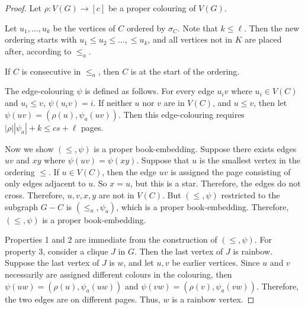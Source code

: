 \begin{proof}
	Let \(\rho: V(G) \rightarrow [c]\) be a proper colouring of \(V(G)\).

	Let \(u_1, \ldots, u_k\) be the vertices of \(C\) ordered by \(\sigma_C\). Note that \(k \leq \ell\). Then the new ordering starts with \(u_1 \leq u_2 \leq \ldots, \leq u_k\), and all vertices not in \(K\) are placed after, according to \(\leq_a\).

	If $C$ is consecutive in $\leq_a$, then $C$ is at the start of the ordering. 

	The edge-colouring \(\psi\) is defined as follows. For every edge \(u_i v\) where \(u_i \in V(C)\) and \(u_i \leq v\), \(\psi(u_i v) = i\). If neither \(u\) nor \(v\) are in \(V(C)\), and \(u \leq v\), then let \(\psi(uv) = (\rho(u), \psi_a(uv))\). Then this edge-colouring requires \(|\rho| |\psi_a| + k \leq cs + \ell\) pages.

	Now we show \((\leq, \psi)\) is a proper book-embedding. Suppose there exists edges \(uv\) and \(xy\) where \(\psi(uv) = \psi(xy)\). Suppose that \(u\) is the smallest vertex in the ordering \(\leq\). If \(u \in V(C)\), then the edge \(uv\) is assigned the page consisting of only edges adjacent to $u$. So \(x = u\), but this is a star. Therefore, the edges do not cross. Therefore, \(u, v, x, y\) are not in \(V(C)\). But \((\leq, \psi)\) restricted to the subgraph $G - C$ is \((\leq_a, \psi_a)\), which is a proper book-embedding. Therefore, \((\leq, \psi)\) is a proper book-embedding.  

	Properties 1 and 2 are immediate from the construction of \((\leq, \psi)\). For property 3, consider a clique \(J\) in \(G\). Then the last vertex of \(J\) is rainbow. Suppose the last vertex of \(J\) is \(w\), and let \(u, v\) be earlier vertices. Since \(u\) and \(v\) necessarily are assigned different colours in the colouring, then \(\psi(uw) = (\rho(u), \psi_a(uw))\) and \(\psi(vw) = (\rho(v), \psi_a(vw))\). Therefore, the two edges are on different pages. Thus, \(w\) is a rainbow vertex.
\end{proof}

